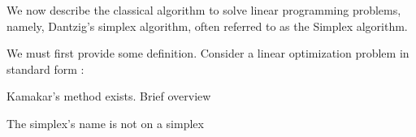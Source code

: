 We now describe the classical algorithm to solve linear programming problems, namely, Dantzig's simplex algorithm, often referred to as the Simplex algorithm.

We must first provide some definition. Consider a linear optimization problem in standard form :



Kamakar's method exists. Brief overview


The simplex's name is not on a simplex